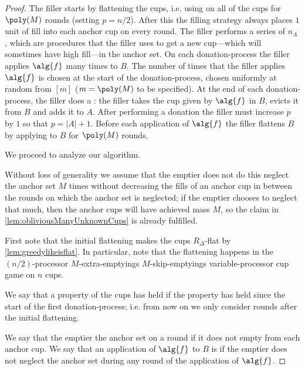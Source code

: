 \begin{proof}
  The filler starts by flattening the cups, i.e. using \flatalg
  on all of the cups for $\poly(M)$ rounds (setting $p=n/2$).
  After this the filling strategy always places $1$ unit of fill
  into each anchor cup on every round. The filler performs a
  series of $n_A$ , which are procedures
  that the filler uses to get a new cup---which will sometimes
  have high fill---in the anchor set. On each donation-process
  the filler applies $\alg{f}$ many times to $B$. The number of
  times that the filler applies $\alg{f}$ is chosen at the start
  of the donation-process, chosen uniformly at random from $[m]$
  ($m = \poly(M)$ to be specified). At the end of each
  donation-process, the filler does a : the filler
  takes the cup given by $\alg{f}$ in $B$, evicts it from $B$ and
  adds it to $A$. After performing a donation the filler must
  increase $p$ by $1$ so that $p=|A|+1$. Before each application
  of $\alg{f}$ the filler flattens $B$ by applying \flatalg to $B$
  for $\poly(M)$ rounds.

  We proceed to analyze our algorithm.

Without loss of generality we assume that the emptier does not do
this neglect the anchor set $M$ times without decreasing the
fills of an anchor cup in between the rounds on which the anchor
set is neglected; if the emptier chooses to neglect that much,
then the anchor cups will have achieved mass $M$, so the claim in
\cref{lem:obliviousManyUnknownCups} is already fulfilled. 

First note that the initial flattening makes the cups
$R_\Delta$-flat by \cref{lem:greedylikeisflat}. In particular,
note that the flattening happens in the $(n/2)$-processor
$M$-extra-emptyings $M$-skip-emptyings variable-processor cup
game on $n$ cups.

We say that a property of the cups has  held if the
property has held since the start of the first donation-process;
i.e. from now on we only consider rounds after the initial
flattening.

We say that the emptier  the anchor set on a round
if it does not empty from each anchor cup. We say that an
application of $\alg{f}$ to $B$ is
 if the emptier does not neglect the
anchor set during any round of the application of $\alg{f}$. 


\end{proof}
